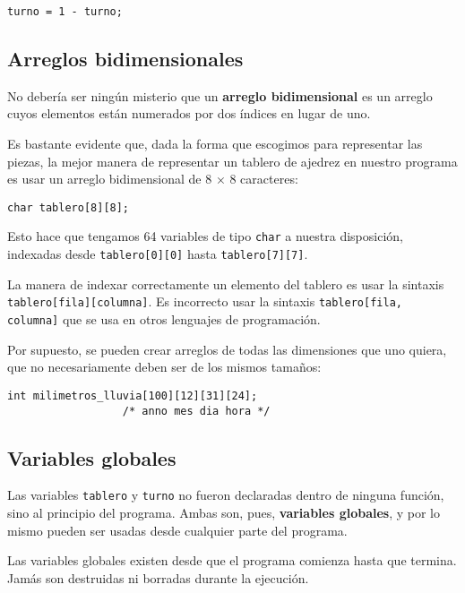 \begin{lstlisting}
turno = 1 - turno;
\end{lstlisting}

\subsection{Arreglos bidimensionales}

No debería ser ningún misterio que un \textbf{arreglo bidimensional} es
un arreglo cuyos elementos están numerados por dos índices en lugar de
uno.

Es bastante evidente que, dada la forma que escogimos para representar
las piezas, la mejor manera de representar un tablero de ajedrez en
nuestro programa es usar un arreglo bidimensional de 8 × 8 caracteres:

\begin{lstlisting}
char tablero[8][8];
\end{lstlisting}

Esto hace que tengamos 64 variables de tipo \lstinline!char! a nuestra
disposición, indexadas desde \lstinline!tablero[0][0]! hasta
\lstinline!tablero[7][7]!.

La manera de indexar correctamente un elemento del tablero es usar la
sintaxis \lstinline!tablero[fila][columna]!. Es incorrecto usar la
sintaxis \lstinline!tablero[fila, columna]! que se usa en otros
lenguajes de programación.

Por supuesto, se pueden crear arreglos de todas las dimensiones que uno
quiera, que no necesariamente deben ser de los mismos tamaños:

\begin{lstlisting}
int milimetros_lluvia[100][12][31][24];
                  /* anno mes dia hora */
\end{lstlisting}

\subsection{Variables globales}

Las variables \lstinline!tablero! y \lstinline!turno! no fueron
declaradas dentro de ninguna función, sino al principio del programa.
Ambas son, pues, \textbf{variables globales}, y por lo mismo pueden ser
usadas desde cualquier parte del programa.

Las variables globales existen desde que el programa comienza hasta que
termina. Jamás son destruidas ni borradas durante la ejecución.

